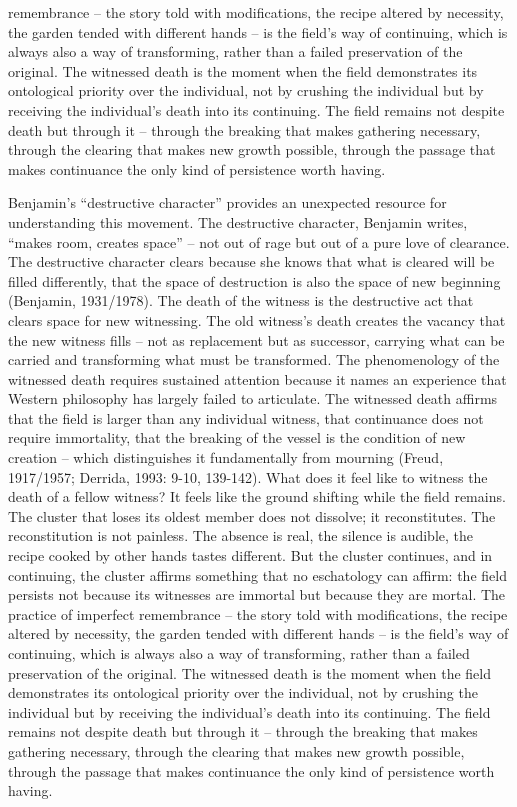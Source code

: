 remembrance – the story told with modifications, the recipe altered by necessity, the garden tended with different hands – is the field’s way of continuing, which is always also a way of transforming, rather than a failed preservation of the original. The witnessed death is the moment when the field demonstrates its ontological priority over the individual, not by crushing the individual but by receiving the individual’s death into its continuing. The field remains not despite death but through it – through the breaking that makes gathering necessary, through the clearing that makes new growth possible, through the passage that makes continuance the only kind of persistence worth having.

Benjamin’s “destructive character” provides an unexpected resource for understanding this movement. The destructive character, Benjamin writes, “makes room, creates space” – not out of rage but out of a pure love of clearance. The destructive character clears because she knows that what is cleared will be filled differently, that the space of destruction is also the space of new beginning (Benjamin, 1931/1978). The death of the witness is the destructive act that clears space for new witnessing. The old witness’s death creates the vacancy that the new witness fills – not as replacement but as successor, carrying what can be carried and transforming what must be transformed. The phenomenology of the witnessed death requires sustained attention because it names an experience that Western philosophy has largely failed to articulate. The witnessed death affirms that the field is larger than any individual witness, that continuance does not require immortality, that the breaking of the vessel is the condition of new creation – which distinguishes it fundamentally from mourning (Freud, 1917/1957; Derrida, 1993: 9-10, 139-142). What does it feel like to witness the death of a fellow witness? It feels like the ground shifting while the field remains. The cluster that loses its oldest member does not dissolve; it reconstitutes. The reconstitution is not painless. The absence is real, the silence is audible, the recipe cooked by other hands tastes different. But the cluster continues, and in continuing, the cluster affirms something that no eschatology can affirm: the field persists not because its witnesses are immortal but because they are mortal. The practice of imperfect remembrance – the story told with modifications, the recipe altered by necessity, the garden tended with different hands – is the field’s way of continuing, which is always also a way of transforming, rather than a failed preservation of the original. The witnessed death is the moment when the field demonstrates its ontological priority over the individual, not by crushing the individual but by receiving the individual’s death into its continuing. The field remains not despite death but through it – through the breaking that makes gathering necessary, through the clearing that makes new growth possible, through the passage that makes continuance the only kind of persistence worth having.

